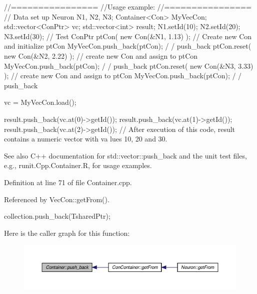 \begin{DoxyCode}
                //================
                //Usage example:
                //================
                // Data set up
                        Neuron N1, N2, N3;
                        Container<Con> MyVecCon;
                        std::vector<ConPtr> vc;
                        std::vector<int> result;
                        N1.setId(10);
                        N2.setId(20);
                        N3.setId(30);
                // Test
                        ConPtr ptCon( new Con(&N1, 1.13) );     // Create new Con
       and initialize ptCon
                        MyVecCon.push_back(ptCon);                              /
      / push_back
                        ptCon.reset(  new Con(&N2, 2.22) );             // create
       new Con and assign to ptCon
                        MyVecCon.push_back(ptCon);                              /
      / push_back
                        ptCon.reset(  new Con(&N3, 3.33) );             // create
       new Con and assign to ptCon
                        MyVecCon.push_back(ptCon);                              /
      / push_back

                        vc = MyVecCon.load();

                        result.push_back(vc.at(0)->getId());
                        result.push_back(vc.at(1)->getId());
                        result.push_back(vc.at(2)->getId());
        // After execution of this code, result contains a numeric vector with va
      lues 10, 20 and 30.
\end{DoxyCode}


\begin{DoxySeeAlso}{See also}
C++ documentation for std::vector::push\_\-back and the unit test files, e.g., runit.Cpp.Container.R, for usage examples. 
\end{DoxySeeAlso}


Definition at line 71 of file Container.cpp.



Referenced by VecCon::getFrom().


\begin{DoxyCode}
  {
    collection.push_back(TsharedPtr);
  }
\end{DoxyCode}


Here is the caller graph for this function:
\nopagebreak
\begin{figure}[H]
\begin{center}
\leavevmode
\includegraphics[width=400pt]{class_container_afd87c69cb799ed7b434c29090083a285_icgraph}
\end{center}
\end{figure}


